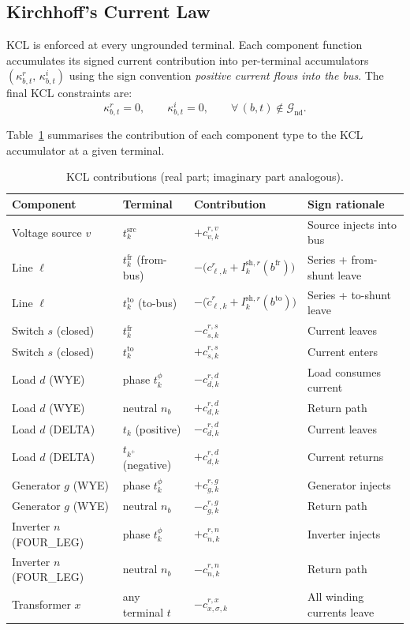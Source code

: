 \documentclass[11pt,a4paper]{article}
\newcommand{\mc}[1]{\mathcal{#1}}
\begin{document}
\subsection{Kirchhoff's Current Law}

KCL is enforced at every ungrounded terminal.  Each component function
accumulates its signed current contribution into per-terminal accumulators
$(\kappa^r_{b,t},\,\kappa^i_{b,t})$ using the sign convention
\emph{positive current flows into the bus}.  The final KCL constraints are:
%
\begin{equation}
  \kappa^r_{b,t} = 0,\qquad
  \kappa^i_{b,t} = 0,\qquad
  \forall\,(b,t)\notin\mc{G}_\text{nd}.
  \label{eq:kcl}
\end{equation}

Table~\ref{tab:kcl} summarises the contribution of each component type to the
KCL accumulator at a given terminal.

\begin{table}[h!]
\centering
\caption{KCL contributions (real part; imaginary part analogous).}
\label{tab:kcl}
\renewcommand{\arraystretch}{1.3}
\begin{tabular}{@{}llll@{}}
\toprule
Component & Terminal & Contribution & Sign rationale \\
\midrule
Voltage source $v$ & $t^\text{src}_k$ & $+c^{r,v}_{v,k}$ & Source injects into bus \\
Line $\ell$ & $t^\text{fr}_k$ (from-bus) & $-\bigl(c^r_{\ell,k} + I^{\text{sh},r}_k(b^\text{fr})\bigr)$ & Series + from-shunt leave \\
Line $\ell$ & $t^\text{to}_k$ (to-bus) & $-\bigl(\tilde{c}^r_{\ell,k} + I^{\text{sh},r}_k(b^\text{to})\bigr)$ & Series + to-shunt leave \\
Switch $s$ (closed) & $t^\text{fr}_k$ & $-c^{r,s}_{s,k}$ & Current leaves \\
Switch $s$ (closed) & $t^\text{to}_k$ & $+c^{r,s}_{s,k}$ & Current enters \\
Load $d$ (WYE) & phase $t^\phi_k$ & $-c^{r,d}_{d,k}$ & Load consumes current \\
Load $d$ (WYE) & neutral $n_b$ & $+c^{r,d}_{d,k}$ & Return path \\
Load $d$ (DELTA) & $t_k$ (positive) & $-c^{r,d}_{d,k}$ & Current leaves \\
Load $d$ (DELTA) & $t_{k^+}$ (negative) & $+c^{r,d}_{d,k}$ & Current returns \\
Generator $g$ (WYE) & phase $t^\phi_k$ & $+c^{r,g}_{g,k}$ & Generator injects \\
Generator $g$ (WYE) & neutral $n_b$ & $-c^{r,g}_{g,k}$ & Return path \\
Inverter $n$ (FOUR\_LEG) & phase $t^\phi_k$ & $+c^{r,n}_{n,k}$ & Inverter injects \\
Inverter $n$ (FOUR\_LEG) & neutral $n_b$ & $-c^{r,n}_{n,k}$ & Return path \\
Transformer $x$ & any terminal $t$ & $-c^{r,x}_{x,\sigma,k}$ & All winding currents leave \\
\bottomrule
\end{tabular}
\end{table}
\end{document}

